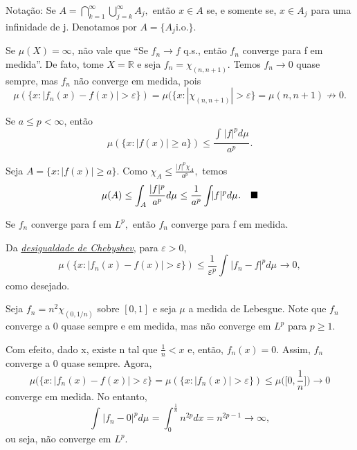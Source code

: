 \documentclass[MeasureTheory/measure_theory.tex]{subfiles}
\begin{document}
Notação: Se \(A = \bigcap_{k=1}^{\infty}\bigcup_{j=k}^{\infty}A_{j},\) então \(x\in A\) se, e somente se, \(x\in A_{j}\) para uma infinidade de j. Denotamos por \(A = \{A_{j}\mathrm{i.o.}\}.\)
\begin{example}
	Se \(\mu (X) = \infty\), não vale que ``Se \(f_{n}\to f\) q.s., então \(f_{n}\) converge para f em medida''. De fato, tome \(X = \mathbb{R}\) e seja \(f_{n} = \chi_{(n, n+1)}.\) Temos \(f_{n}\to 0\) quase sempre, mas \(f_{n}\) não converge em medida, pois
	\[
		\mu (\{x: |f_{n}(x) - f(x)|> \varepsilon \}) = \mu (\{x: |\chi_{(n, n+1)}| > \varepsilon \} = \mu (n, n+1)\not\to 0.
	\]
\end{example}
\hypertarget{chebyshev}{
	\begin{lemma*}[Chebyshev]
		Se \(a\leq p < \infty\), então
		\[
			\mu (\{x: |f(x)| \geq a\}) \leq \frac{\int_{}|f|^{p} d\mu_{}}{a^{p}}.
		\]
	\end{lemma*}}
\begin{proof*}
	Seja \(A = \{x: |f(x)| \geq a\}.\) Como \(\chi_{A} \leq \frac{|f|^{p}\chi_{A}}{a^{p}},\) temos
	\[
		\mu (A) \leq \int_{A}\frac{|f|^{p}}{a^{p}} d\mu_{} \leq \frac{1}{a^{p}}\int_{}|f|^{p} d\mu_{}. \quad \text{$\blacksquare$}
	\]
\end{proof*}
\begin{prop*}
	Se \(f_{n}\) converge para f em \(L^{p},\) então \(f_{n}\) converge para f em medida.
\end{prop*}
\begin{proof*}
	Da \hyperlink{chebyshev}{\textit{desigualdade de Chebyshev}}, para \(\varepsilon >0\),
	\[
		\mu (\{x: |f_{n}(x) - f(x)| > \varepsilon \}) \leq \frac{1}{\varepsilon ^{p}}\int_{}|f_{n}-f|^{p} d\mu_{}\to 0,
	\]
	como desejado. \qedsymbol
\end{proof*}
\begin{example}
	Seja \(f_{n} = n^{2}\chi_{(0, 1/n)}\) sobre \([0, 1]\) e seja \(\mu \) a medida de Lebesgue. Note que \(f_{n}\) converge a 0 quase sempre e em medida, mas não converge em \(L^{p}\) para \(p \geq 1\).

	Com efeito, dado x, existe n tal que \(\frac{1}{n} < x\) e, então, \(f_{n}(x) = 0.\) Assim, \(f_{n}\) converge a 0 quase sempre. Agora,
	\[
		\mu (\{x: |f_{n}(x) - f(x)| > \varepsilon \} = \mu (\{x: |f_{n}(x)| > \varepsilon \}) \leq \mu \biggl(\biggl[0, \frac{1}{n}\biggr]\biggr)\to 0
	\]
	converge em medida. No entanto,
	\[
		\int_{}|f_{n}-0|^{p} d\mu_{} = \int_{0}^{\frac{1}{n}}n^{2p}dx = n^{2p-1}\to \infty,
	\]
	ou seja, não converge em \(L^{p}.\)
\end{example}
\end{document}
